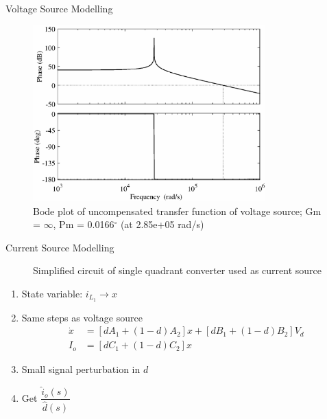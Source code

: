 \documentclass[10pt]{beamer}
\begin{document}
\begin{frame}{Voltage Source Modelling}
  \begin{figure}
    \centering
    \includegraphics[width=0.8\textwidth]{uncompensated-vs}
    \caption{Bode plot of uncompensated transfer function of voltage source; \hspace{1cm} Gm = $\infty$,  Pm = 0.0166$^\circ$ (at 2.85e+05 rad/s)}
    \label{fig:uncomp-vs}
  \end{figure}
\end{frame}

\begin{frame}{Current Source Modelling}
  \begin{figure}
    \centering
    
    \caption{Simplified circuit of single quadrant converter used as current source}
    \label{fig:working-5}
  \end{figure}
  \vspace{-0.5cm}
  \begin{enumerate}
\item State variable: $i_{L_1} \rightarrow x$
\item Same steps as voltage source
  \begin{equation}
    \begin{split}
      \dot{x} &= [dA_1+(1-d)A_2]x + [dB_1 + (1-d)B_2]V_d\\
      I_o &= [dC_1+(1-d)C_2]x
    \end{split}
    \label{eq:mod14}
  \end{equation}
\item Small signal perturbation in $d$
\item Get $\dfrac{\hat{i}_o(s)}{\hat{d}(s)}$
\end{enumerate}
\end{frame}
\end{document}
